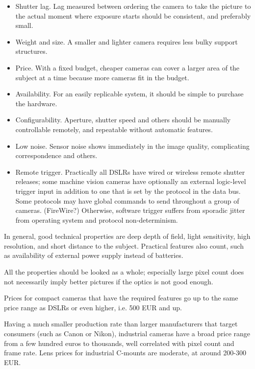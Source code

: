 \begin{itemize}
\item Shutter lag. Lag measured between ordering the camera to take the picture to the actual moment where exposure starts should be consistent, and preferably small.
\item Weight and size. A smaller and lighter camera requires less bulky support structures.
\item Price. With a fixed budget, cheaper cameras can cover a larger area of the subject at a time because more cameras fit in the budget.
\item Availability. For an easily replicable system, it should be simple to purchase the hardware.
\item Configurability. Aperture, shutter speed and others should be manually controllable remotely, and repeatable without automatic features.
\item Low noise. Sensor noise shows immediately in the image quality, complicating correspondence and others.
\item Remote trigger. Practically all DSLRs have wired or wireless remote shutter releases; some machine vision cameras have optionally an external logic-level trigger input in addition to one that is set by the protocol in the data bus. Some protocols may have global commands to send throughout a group of cameras. (FireWire?) Otherwise, software trigger suffers from sporadic jitter from operating system and protocol non-determinism.
\end{itemize}

In general, good technical properties are deep depth of field, light sensitivity, high resolution, and short distance to the subject.
Practical features also count, such as availability of external power supply instead of batteries.

All the properties should be looked as a whole; especially large pixel count does not necessarily imply better pictures if the optics is not good enough.


Prices for compact cameras that have the required features go up to the same price range as DSLRs or even higher, i.e. 500 EUR and up.

Having a much smaller production rate than larger manufacturers that target consumers (such as Canon or Nikon), industrial cameras have a broad price range from a few hundred euros to thousands, well correlated with pixel count and frame rate.
Lens prices for industrial C-mounts are moderate, at around 200-300 EUR.


